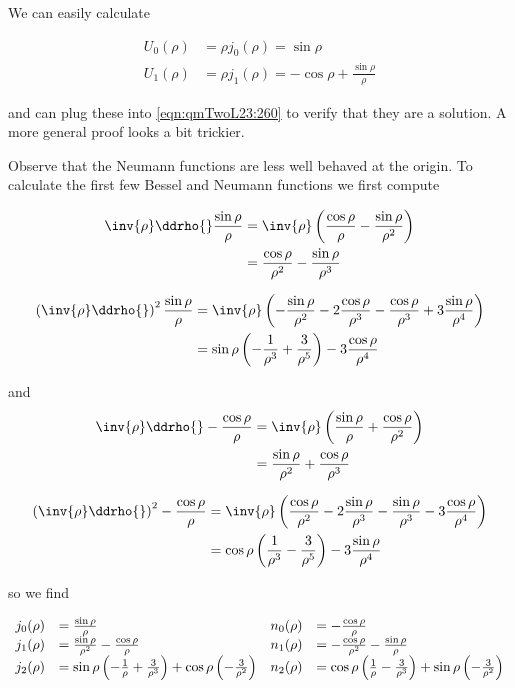 We can easily calculate

\begin{align}\label{eqn:qmTwoL23:300}
U_0(\rho) &= \rho j_0(\rho) = \sin\rho \\
U_1(\rho) &= \rho j_1(\rho) = -\cos\rho + \frac{\sin\rho}{\rho}
\end{align}

and can plug these into \ref{eqn:qmTwoL23:260} to verify that they are a solution.  A more general proof looks a bit trickier.

Observe that the Neumann functions are less well behaved at the origin.  To calculate the first few Bessel and Neumann functions we first compute

\begin{align*}
\inv{\rho} \ddrho{} \frac{\sin\rho}{\rho}
&= \inv{\rho} \left(
\frac{\cos\rho}{\rho}
-\frac{\sin\rho}{\rho^2}
\right) \\
&=
\frac{\cos\rho}{\rho^2}
-\frac{\sin\rho}{\rho^3}
\end{align*}

\begin{align*}
\left( \inv{\rho} \ddrho{} \right)^2 \frac{\sin\rho}{\rho}
&= \inv{\rho} \left(
-\frac{\sin\rho}{\rho^2}
-2\frac{\cos\rho}{\rho^3}
-\frac{\cos\rho}{\rho^3}
+3\frac{\sin\rho}{\rho^4}
\right) \\
&=
\sin\rho\left(
-\frac{1}{\rho^3}
+\frac{3}{\rho^5}
\right)
-3\frac{\cos\rho}{\rho^4}
\end{align*}

and
\begin{align*}
\inv{\rho} \ddrho{} -\frac{\cos\rho}{\rho}
&= \inv{\rho} \left(
\frac{\sin\rho}{\rho}
+\frac{\cos\rho}{\rho^2}
\right) \\
&=
\frac{\sin\rho}{\rho^2}
+\frac{\cos\rho}{\rho^3}
\end{align*}

\begin{align*}
\left( \inv{\rho} \ddrho{} \right)^2 -\frac{\cos\rho}{\rho}
&= \inv{\rho} \left(
\frac{\cos\rho}{\rho^2}
-2\frac{\sin\rho}{\rho^3}
-\frac{\sin\rho}{\rho^3}
-3\frac{\cos\rho}{\rho^4}
\right) \\
&=
\cos\rho\left(
\frac{1}{\rho^3}
-\frac{3}{\rho^5}
\right)
-3\frac{\sin\rho}{\rho^4}
\end{align*}

so we find

\begin{equation}\label{eqn:qmTwoL23:340}
\begin{array}{l l l l}
j_0(\rho) &= \frac{\sin\rho}{\rho} 					& n_0(\rho) &= -\frac{\cos\rho}{\rho} 	\\
j_1(\rho) &= \frac{\sin\rho}{\rho^2} -\frac{\cos\rho}{\rho} 		& n_1(\rho) &= -\frac{\cos\rho}{\rho^2} -\frac{\sin\rho}{\rho} \\
j_2(\rho) &= \sin\rho \left(-\frac{1}{\rho} + \frac{3}{\rho^3} \right) +\cos\rho \left(-\frac{3}{\rho^2} \right)
& n_2(\rho) &= \cos\rho \left(\frac{1}{\rho} - \frac{3}{\rho^3} \right) +\sin\rho \left(-\frac{3}{\rho^2} \right)
\end{array}
\end{equation}

